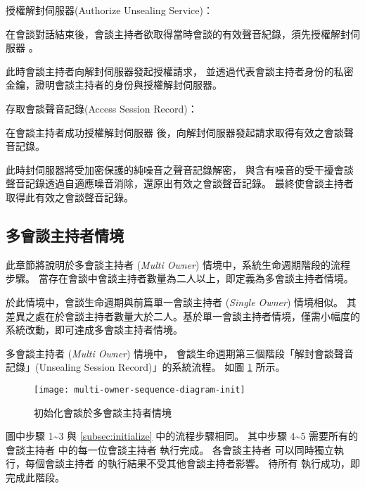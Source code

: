 \begin{steps}
    \item 授權解封伺服器(Authorize Unsealing Service)：

            在會談對話結束後，會談主持者欲取得當時會談的有效聲音紀錄，須先授權解封伺服器 \DEFserver。

            此時會談主持者向解封伺服器發起授權請求，
        並透過代表會談主持者身份的私密金鑰，證明會談主持者的身份與授權解封伺服器。

    \item 存取會談聲音記錄(Access Session Record)：

            在會談主持者成功授權解封伺服器 \DEFserver 後，向解封伺服器發起請求取得有效之會談聲音記錄。

            此時封伺服器將受加密保護的純噪音之聲音記錄解密，
        與含有噪音的受干擾會談聲音記錄透過自適應噪音消除，還原出有效之會談聲音記錄。
        最終使會談主持者取得此有效之會談聲音記錄。
\end{steps}


\subsection{多會談主持者情境}

    此章節將說明於多會談主持者 ({\it Multi Owner}) 情境中，系統生命週期階段的流程步驟。
當存在會談中會談主持者數量為二人以上，即定義為多會談主持者情境。

    於此情境中，會談生命週期與前篇單一會談主持者 ({\it Single Owner}) 情境相似。
其差異之處在於會談主持者數量大於二人。基於單一會談主持者情境，僅需小幅度的系統改動，即可達成多會談主持者情境。

    多會談主持者 ({\it Multi Owner}) 情境中，
會談生命週期第三個階段「解封會談聲音記錄」(Unsealing Session Record)」的系統流程。
如圖 \ref{fig:m-o-init} 所示。

\begin{figure}[H]
    \centering
    \texttt{[image: multi-owner-sequence-diagram-init]}
    \caption{初始化會談於多會談主持者情境}\label{fig:m-o-init}
\end{figure}

    圖中步驟 1\textasciitilde3 與 \ref{subsec:initialize}  中的流程步驟相同。
其中步驟 4\textasciitilde5 需要所有的會談主持者 \DEFownerAll 中的每一位會談主持者 \DEFowner 執行完成。
各會談主持者 \DEFowner 可以同時獨立執行，每個會談主持者 \DEFowner 的執行結果不受其他會談主持者影響。
待所有 \DEFowner 執行成功，即完成此階段。

